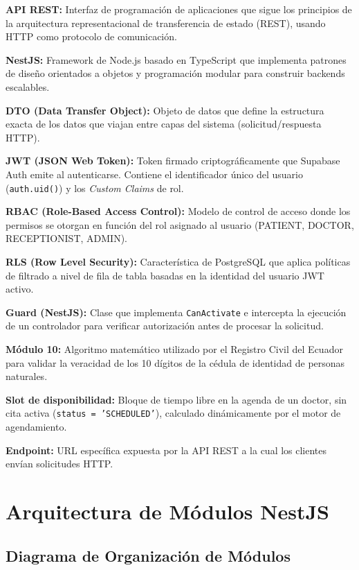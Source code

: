 \documentclass[a4paper,12pt]{article}
\begin{document}
\textbf{API REST:} Interfaz de programación de aplicaciones que sigue los principios de la arquitectura representacional de transferencia de estado (REST), usando HTTP como protocolo de comunicación.

\textbf{NestJS:} Framework de Node.js basado en TypeScript que implementa patrones de diseño orientados a objetos y programación modular para construir backends escalables.

\textbf{DTO (Data Transfer Object):} Objeto de datos que define la estructura exacta de los datos que viajan entre capas del sistema (solicitud/respuesta HTTP).

\textbf{JWT (JSON Web Token):} Token firmado criptográficamente que Supabase Auth emite al autenticarse. Contiene el identificador único del usuario (\texttt{auth.uid()}) y los \textit{Custom Claims} de rol.

\textbf{RBAC (Role-Based Access Control):} Modelo de control de acceso donde los permisos se otorgan en función del rol asignado al usuario (PATIENT, DOCTOR, RECEPTIONIST, ADMIN).

\textbf{RLS (Row Level Security):} Característica de PostgreSQL que aplica políticas de filtrado a nivel de fila de tabla basadas en la identidad del usuario JWT activo.

\textbf{Guard (NestJS):} Clase que implementa \texttt{CanActivate} e intercepta la ejecución de un controlador para verificar autorización antes de procesar la solicitud.

\textbf{Módulo 10:} Algoritmo matemático utilizado por el Registro Civil del Ecuador para validar la veracidad de los 10 dígitos de la cédula de identidad de personas naturales.

\textbf{Slot de disponibilidad:} Bloque de tiempo libre en la agenda de un doctor, sin cita activa (\texttt{status = 'SCHEDULED'}), calculado dinámicamente por el motor de agendamiento.

\textbf{Endpoint:} URL específica expuesta por la API REST a la cual los clientes envían solicitudes HTTP.

\section{Arquitectura de Módulos NestJS}

\subsection{Diagrama de Organización de Módulos}
\end{document}
